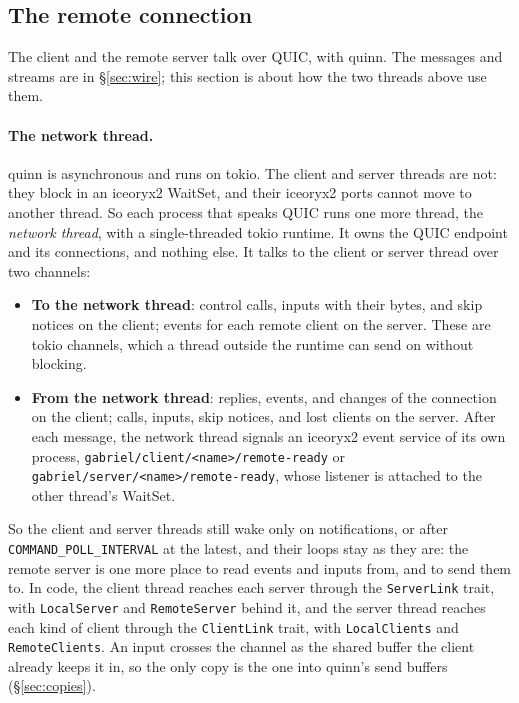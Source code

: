 \documentclass[11pt]{article}
\newcommand{\code}[1]{\texttt{#1}}
\begin{document}
\subsection{The remote connection}
\label{sec:remote}

The client and the remote server talk over QUIC, with quinn. The messages and
streams are in \S\ref{sec:wire}; this section is about how the two threads
above use them.

\paragraph{The network thread.} quinn is asynchronous and runs on tokio. The
client and server threads are not: they block in an iceoryx2 WaitSet, and
their iceoryx2 ports cannot move to another thread. So each process that
speaks QUIC runs one more thread, the \emph{network thread}, with a
single-threaded tokio runtime. It owns the QUIC endpoint and its
connections, and nothing else. It talks to the client or server thread over
two channels:
\begin{itemize}[nosep]
  \item \textbf{To the network thread}: control calls, inputs with their
        bytes, and skip notices on the client; events for each remote client
        on the server. These are tokio channels, which a thread outside the
        runtime can send on without blocking.
  \item \textbf{From the network thread}: replies, events, and changes of the
        connection on the client; calls, inputs, skip notices, and lost
        clients on the server. After each message, the network thread
        signals an iceoryx2 event service of its own process,
        \nolinkurl{gabriel/client/<name>/remote-ready} or
        \nolinkurl{gabriel/server/<name>/remote-ready}, whose listener is
        attached to the other thread's WaitSet.
\end{itemize}
So the client and server threads still wake only on notifications, or after
\code{COMMAND\_POLL\_INTERVAL} at the latest, and their loops stay as they
are: the remote server is one more place to read events and inputs from, and
to send them to. In code, the client thread reaches each server through the
\code{ServerLink} trait, with \code{LocalServer} and \code{RemoteServer}
behind it, and the server thread reaches each kind of client through the
\code{ClientLink} trait, with \code{LocalClients} and \code{RemoteClients}.
An input crosses the channel as the shared buffer the client already keeps
it in, so the only copy is the one into quinn's send buffers
(\S\ref{sec:copies}).
\end{document}
